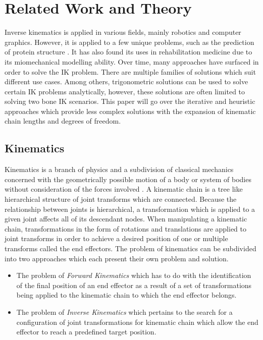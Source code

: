 \chapter{Related Work and Theory}
Inverse kinematics is applied in various fields, mainly robotics and computer
graphics. However, it is applied to a few unique problems, such as the
prediction of protein structure \cite{ccd_protein}. It has also found its uses in
rehabilitation medicine due to its miomechanical modelling ability. Over time,
many approaches have surfaced in order to solve the IK problem. There are
multiple families of solutions \cite{Aristidou2011} which suit different use
cases. Among others, trigonometric solutions can be used to solve certain IK
problems analytically, however, these solutions are often limited to solving two
bone IK scenarios. This paper will go over the iterative and heuristic
approaches which provide less complex solutions with the expansion of kinematic
chain lengths and degrees of freedom.

\section{Kinematics}
Kinematics is a branch of physics and a subdivision of classical mechanics
concerned with the geometrically possible motion of a body or system of bodies
without consideration of the forces involved \cite{kinematics_britannica}.
A kinematic chain is a tree like hierarchical structure of joint transforms
which are connected. Because the relationship between joints is hierarchical,
a transformation which is applied to a given joint affects all of its descendant
nodes. When manipulating a kinematic chain, transformations in the form of
rotations and translations are applied to joint transforms in order to achieve
a desired position of one or multiple transforms called the end effectors. The
problem of kinematics can be subdivided into two approaches which each present
their own problem and solution.

\begin{itemize}
    \item The problem of \textit{Forward Kinematics} which has to do with the
        identification of the final position of an end effector as a result of
        a set of transformations being applied to the kinematic chain to which
        the end effector belongs.
    \item The problem of \textit{Inverse Kinematics} which pertains to the
        search for a configuration of joint transformations for kinematic
        chain which allow the end effector to reach a predefined target
        position.
\end{itemize}

